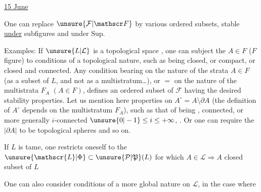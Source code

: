  \uline{15 June}

One can replace $\unsure{\mathcal F|\mathscr F}$ by various  ordered subsets, stable \uline{under} \deleted{$\unsure{\leq|\in}$}  
subfigures  and under $\mathrm{Sup}$.

Examples: If $\unsure{L|\mathcal L}$ is a topological space , 
one can subject the $A\in F$  ($F$ figure)
to conditions of a topological nature, such as being closed, or  compact, or closed and connected. Any condition
bearing on the nature of the strata $A\in F$ (as a subset of $L$, and not as a multistratum\ldots), or $=$ on the nature of the
multistrata $F_A$ $(A\in F)$, defines an ordered subset of $\mathcal F$ having the desired stability properties. Let us mention here
properties  on  $A^\circ=A\setminus\partial A$ (the definition of $A^\circ$ depends on the multistratum $F_A$), such as that of being  ,
  connected, or more generally $i$-connected $\unsure{0|-1}\leq i\leq+\infty$,  . Or one can require the $|\partial A|$
to be topological spheres and so on.

If $L$ is  tame, one restricts oneself to the $\unsure{\mathscr{L}|\Phi}\subset\unsure{\mathcal P|\mathfrak P}(L)$ for which $A\in\mathscr{L}\Longrightarrow A$ closed subset \uline{} of $L$

One can also consider conditions of a more global nature on $\mathscr{L}$, in the case where

